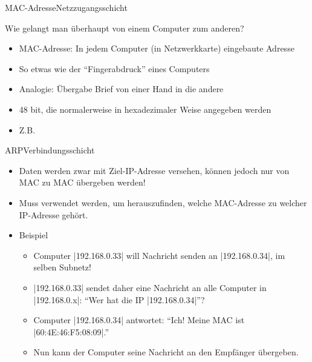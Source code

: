 \begin{frame}[fragile]{\faFingerprint{} \acrshort{MAC}-Adresse}{Netzzugangsschicht}
    \begin{center}
        Wie gelangt man überhaupt von einem Computer zum anderen?
    \end{center}
    \begin{itemize}[<+->]
        \item \gls{MAC}-Adresse: In jedem Computer (in Netzwerkkarte) eingebaute Adresse
        \item So etwas wie der \enquote{Fingerabdruck} eines Computers
        \item Analogie: Übergabe Brief von einer Hand in die andere
        \item 48 bit, die normalerweise in hexadezimaler Weise angegeben werden
        \item Z.B. 
    \end{itemize}
\end{frame}

\begin{frame}[fragile]{\acrfull{ARP}}{Verbindungsschicht}
    \begin{itemize}[<+->]
        \item Daten werden zwar mit Ziel-\gls{IP}-Adresse versehen, können jedoch nur von \gls{MAC} zu \gls{MAC} übergeben werden!
        \item Muss verwendet werden, um herauszufinden, welche \gls{MAC}-Adresse zu welcher \gls{IP}-Adresse gehört.
        \item Beispiel
              \begin{itemize}[<+->]
                  \item Computer \commandbox|192.168.0.33| will Nachricht senden an \commandbox|192.168.0.34|, im selben Subnetz!
                  \item \commandbox|192.168.0.33| sendet daher eine Nachricht an alle Computer in \commandbox|192.168.0.x|: \enquote{Wer hat die \gls{IP} \commandbox|192.168.0.34|}?
                  \item Computer \commandbox|192.168.0.34| antwortet: \enquote{Ich! Meine \gls{MAC} ist \commandbox|60:4E:46:F5:08:09|.}
                  \item Nun kann der Computer seine Nachricht an den Empfänger übergeben.
              \end{itemize}
    \end{itemize}
\end{frame}

